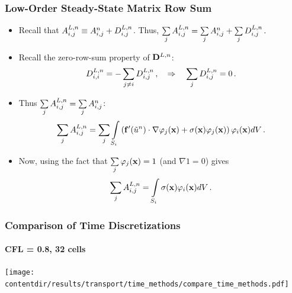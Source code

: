 \documentclass{beamer} \useoutertheme{infolines}
\newcommand{\contentdir}{../../dissertation/content}
\begin{document}
\begin{frame}
\frametitle{Low-Order Steady-State Matrix Row Sum}

\begin{itemize}
  \item Recall that $A_{i,j}^{L,n}\equiv A_{i,j}^{n}
    +D_{i,j}^{L,n}$. Thus,
      $\sum\limits_jA_{i,j}^{L,n} = \sum\limits_jA_{i,j}^{n}
      +\sum\limits_jD_{i,j}^{L,n} \,.$
  \item Recall the zero-row-sum property of $\diffusionmatrix^{L,n}$:
    \begin{equation}
      D_{i,i}^{L,n} =
        -\sum_{j\ne i}D_{i,j}^{L,n}
      \,, \quad \Rightarrow \quad
        \sum\limits_jD_{i,j}^{L,n} = 0 \,.
    \end{equation}
  \item Thus $\sum\limits_jA^{L,n}_{i,j} =
   \sum\limits_j A^{n}_{i,j}$:
\begin{equation}
  \sum\limits_jA^{L,n}_{i,j} = \sum\limits_j \int\limits_{S_i}
    \left(\mathbf{f}'(\tilde{u}^n)
      \cdot\nabla\varphi_j(\mathbf{x}) +
      \sigma(\mathbf{x})\varphi_j(\mathbf{x})\right)\varphi_i(\mathbf{x}) dV \,.
\end{equation}
  \item Now, using the fact that $\sum\limits_j\varphi_j(\mathbf{x})=1$
    (and $\nabla 1 = 0$) gives
    \begin{equation}
      \sum\limits_jA^{L,n}_{i,j} =
        \int\limits_{S_i}\sigma(\mathbf{x})\varphi_i(\mathbf{x}) dV \,.
    \end{equation}
\end{itemize}

\end{frame}
\begin{frame}
\frametitle{Comparison of Time Discretizations}
\framesubtitle{CFL = 0.8, 32 cells}

\begin{center}
   \texttt{[image: \\contentdir/results/transport/time\_methods/compare\_time\_methods.pdf]}
\end{center}

\end{frame}
\end{document}

